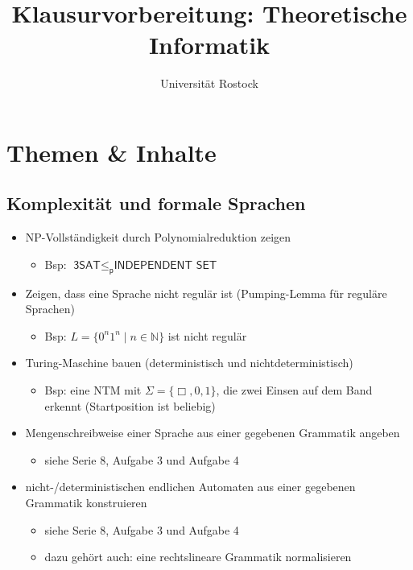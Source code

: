 \documentclass[
  a4paper,
  11pt,
]{scrartcl}
\title{Klausurvorbereitung: Theoretische Informatik}
\subtitle{Universität Rostock}
\date{}
\newcommand{\p}{\leq_{\textsf{p}}}
\newcommand{\N}{\mathbb{N}}
\newcommand{\DreiSAT}{\textsf{3SAT}}
\newcommand{\NP}{\textsf{NP}}
\newcommand{\IS}{\textsf{INDEPENDENT SET}}
\begin{document}
\maketitle

\tableofcontents

\section{Themen \& Inhalte}
\label{sec:themen}

\subsection{Komplexität und formale Sprachen}
\label{sub:themen_inhalte_komplexitat_und_formale_sprachen}

\begin{itemize}
  \item \NP-Vollständigkeit durch Polynomialreduktion zeigen
    \begin{itemize}
      \item Bsp: $\DreiSAT \p \IS$
    \end{itemize}
  \item Zeigen, dass eine Sprache nicht regulär ist (Pumping-Lemma für reguläre
    Sprachen)
    \begin{itemize}
      \item Bsp: $L = \{ 0^n 1^n \mid n \in \N \}$ ist nicht regulär
    \end{itemize}
  \item Turing-Maschine bauen (deterministisch und nichtdeterministisch)
    \begin{itemize}
      \item Bsp: eine NTM mit $\Sigma = \{\Box, 0, 1\}$, die zwei Einsen auf dem
        Band erkennt (Startposition ist beliebig)
    \end{itemize}
  \item Mengenschreibweise einer Sprache aus einer gegebenen Grammatik angeben
    \begin{itemize}
      \item siehe Serie 8, Aufgabe 3 und Aufgabe 4
    \end{itemize}
  \item nicht-/deterministischen endlichen Automaten aus einer gegebenen
    Grammatik konstruieren
    \begin{itemize}
      \item siehe Serie 8, Aufgabe 3 und Aufgabe 4
      \item dazu gehört auch: eine rechtslineare Grammatik normalisieren

\end{itemize}
\end{itemize}
\end{document}
